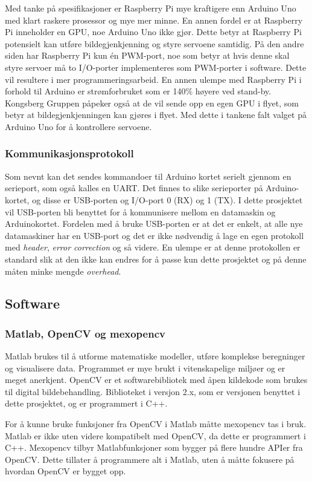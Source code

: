 Med tanke på spesifikasjoner er Raspberry Pi mye kraftigere enn Arduino Uno med klart raskere prosessor og mye mer minne. En annen fordel er at Raspberry Pi inneholder en GPU, noe Arduino Uno ikke gjør. Dette betyr at Raspberry Pi potensielt kan utføre bildegjenkjenning og styre servoene samtidig. På den andre siden har Raspberry Pi kun én PWM-port, noe som betyr at hvis denne skal styre servoer må to I/O-porter implementeres som PWM-porter i software. Dette vil resultere i mer programmeringsarbeid. En annen ulempe med Raspberry Pi i forhold til Arduino er strømforbruket som er 140\% høyere ved stand-by.\cite{ArduinoSpec,RpiSpec} Kongsberg Gruppen påpeker også at de vil sende opp en egen GPU i flyet, som betyr at bildegjenkjenningen kan gjøres i flyet. Med dette i tankene falt valget på Arduino Uno for å kontrollere servoene.

\subsubsection{Kommunikasjonsprotokoll}

Som nevnt kan det sendes kommandoer til Arduino kortet serielt gjennom en serieport, som også kalles en UART. Det finnes to slike serieporter på Arduino-kortet, og disse er USB-porten og I/O-port 0 (RX) og 1 (TX). I dette prosjektet vil USB-porten bli benyttet for å kommunisere mellom en datamaskin og Arduinokortet. Fordelen med å bruke USB-porten er at det er enkelt, at alle nye datamaskiner har en USB-port og det er ikke nødvendig å lage en egen protokoll med \emph{header}, \emph{error correction} og så videre. En ulempe er at denne protokollen er standard slik at den ikke kan endres for å passe kun dette prosjektet og på denne måten minke mengde \emph{overhead}.

\subsection{Software}

\subsubsection{Matlab, OpenCV og mexopencv}
Matlab brukes til å utforme matematiske modeller, utføre komplekse beregninger og visualisere data. \cite{matlab} Programmet er mye brukt i vitenskapelige miljøer og er meget anerkjent. 
OpenCV er et softwarebibliotek med åpen kildekode som brukes til digital bildebehandling. Biblioteket i versjon 2.x, som er versjonen benyttet i dette prosjektet, og er programmert i C++. \cite{docs:opencv}

For å kunne bruke funksjoner fra OpenCV i Matlab måtte mexopencv tas i bruk. Matlab er ikke uten videre kompatibelt med OpenCV, da dette er programmert i C++. Mexopencv tilbyr Matlabfunksjoner som bygger på flere hundre APIer fra OpenCV. \cite{mexopencv} Dette tillater å programmere alt i Matlab, uten å måtte fokusere på hvordan OpenCV er bygget opp. 

